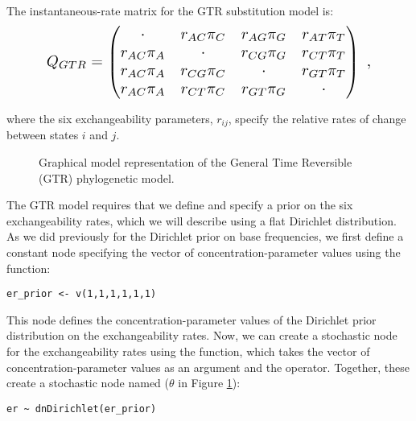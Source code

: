 The instantaneous-rate matrix for the GTR substitution model is:
\begin{equation*}
\resizebox{4in}{!}{%
$Q_{GTR} = \begin{pmatrix}
{\cdot}	   & {r_{AC}\pi_C} & {r_{AG}\pi_G} & {r_{AT}\pi_T} \\
{r_{AC}\pi_A} & {\cdot}       & {r_{CG}\pi_G} & {r_{CT}\pi_T} \\
{r_{AC}\pi_A} & {r_{CG}\pi_C} & {\cdot}       & {r_{GT}\pi_T} \\
{r_{AC}\pi_A} & {r_{CT}\pi_C} & {r_{GT}\pi_G} & {\cdot}       \\
\end{pmatrix} \mbox{  ,} $}
\end{equation*}

where the six exchangeability parameters, $r_{ij}$, specify the relative rates of change between states $i$ and $j$.  


\begin{figure}[h!]
\centering
{}
\caption{\small Graphical model representation of the General Time Reversible (GTR) phylogenetic model.}
\label{fig:gtr}
\end{figure}

The GTR model requires that we define and specify a prior on the six exchangeability rates, which we will describe using a flat Dirichlet distribution.
As we did previously for the Dirichlet prior on base frequencies, we first define a constant node specifying the vector of concentration-parameter values using the  function:
{\tt \begin{snugshade*}
\begin{lstlisting}
er_prior <- v(1,1,1,1,1,1) 
\end{lstlisting}
\end{snugshade*}}
This node defines the concentration-parameter values of the Dirichlet prior distribution on the exchangeability rates. 
Now, we can create a stochastic node for the exchangeability rates using the  function, which takes the vector of concentration-parameter values as an argument and the \cl{\rbdn} operator. 
Together, these create a stochastic node named  ($\theta$ in Figure \ref{fig:gtr}): 
{\tt \begin{snugshade*}
\begin{lstlisting}
er ~ dnDirichlet(er_prior)
\end{lstlisting}
\end{snugshade*}}



